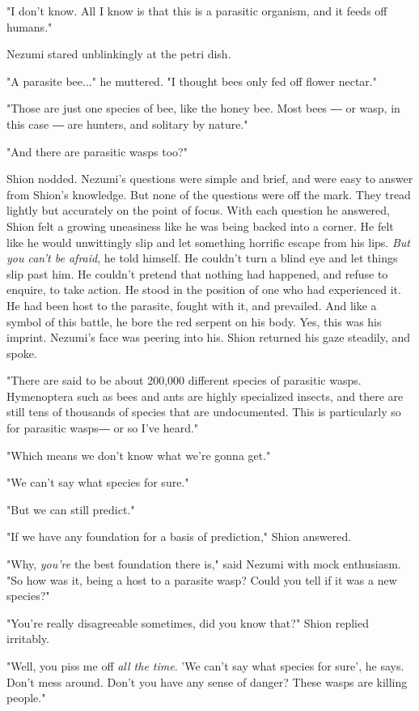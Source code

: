 "I don't know. All I know is that this is a parasitic organism, and it
feeds off humans."

Nezumi stared unblinkingly at the petri dish.

"A parasite bee..." he muttered. "I thought bees only fed off flower
nectar."

"Those are just one species of bee, like the honey bee. Most bees ― or
wasp, in this case ― are hunters, and solitary by nature."

"And there are parasitic wasps too?"

Shion nodded. Nezumi's questions were simple and brief, and were easy to
answer from Shion's knowledge. But none of the questions were off the
mark. They tread lightly but accurately on the point of focus. With each
question he answered, Shion felt a growing uneasiness like he was being
backed into a corner. He felt like he would unwittingly slip and let
something horrific escape from his lips. \emph{But you can't be afraid}, he
told himself. He couldn't turn a blind eye and let things slip past him.
He couldn't pretend that nothing had happened, and refuse to enquire, to
take action. He stood in the position of one who had experienced it. He
had been host to the parasite, fought with it, and prevailed. And like a
symbol of this battle, he bore the red serpent on his body. Yes, this
was his imprint. Nezumi's face was peering into his. Shion returned his
gaze steadily, and spoke.

"There are said to be about 200,000 different species of parasitic
wasps. Hymenoptera such as bees and ants are highly specialized insects,
and there are still tens of thousands of species that are undocumented.
This is particularly so for parasitic wasps― or so I've heard."

"Which means we don't know what we're gonna get."

"We can't say what species for sure."

"But we can still predict."

"If we have any foundation for a basis of prediction," Shion answered.

"Why, \emph{you're} the best foundation there is," said Nezumi with mock
enthusiasm. "So how was it, being a host to a parasite wasp? Could you
tell if it was a new species?"

"You're really disagreeable sometimes, did you know that?" Shion replied
irritably.

"Well, you piss me off \emph{all the time}. 'We can't say what species for
sure', he says. Don't mess around. Don't you have any sense of danger?
These wasps are killing people."

